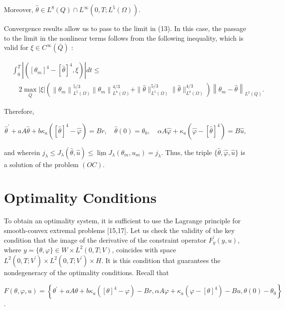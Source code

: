 \documentclass[10pt]{article}
\begin{document}
Moreover, $\widehat{\theta} \in L^{8}(Q) \cap L^{\infty}\left(0, T ; L^{5}(\Omega)\right)$.

Convergence results allow us to pass to the limit in (13). In this case, the passage to the limit in the nonlinear terms follows from the following inequality, which is valid for $\xi \in C^{\infty}(\bar{Q})$ :

$$
\begin{aligned}
& \int_{0}^{T}\left|\left(\left[\theta_{m}\right]^{4}-[\widehat{\theta}]^{4}, \xi\right)\right| d t \leq \\
& \quad 2 \max _{\bar{Q}}|\xi|\left(\left\|\theta_{m}\right\|_{L^{5}(\Omega)}^{5 / 3}\left\|\theta_{m}\right\|_{L^{8}(\Omega)}^{4 / 3}+\|\widehat{\theta}\|_{L^{5}(\Omega)}^{5 / 3}\|\widehat{\theta}\|_{L^{8}(\Omega)}^{4 / 3}\right)\left\|\theta_{m}-\widehat{\theta}\right\|_{L^{2}(Q)} .
\end{aligned}
$$

Therefore,

$$
\widehat{\theta}^{\prime}+a A \widehat{\theta}+b \kappa_{a}\left([\widehat{\theta}]^{4}-\widehat{\varphi}\right)=B r, \quad \widehat{\theta}(0)=\theta_{0}, \quad \alpha A \widehat{\varphi}+\kappa_{a}\left(\widehat{\varphi}-[\widehat{\theta}]^{4}\right)=B \widehat{u},
$$

and wherein $j_{\lambda} \leq J_{\lambda}(\widehat{\theta}, \widehat{u}) \leq \underline{\lim } J_{\lambda}\left(\theta_{m}, u_{m}\right)=j_{\lambda}$. Thus, the triple $\{\widehat{\theta}, \widehat{\varphi}, \widehat{u}\}$ is a solution of the problem $(O C)$.

\section{Optimality Conditions}
To obtain an optimality system, it is sufficient to use the Lagrange principle for smooth-convex extremal problems [15,17]. Let us check the validity of the key condition that the image of the derivative of the constraint operator $F_{y}^{\prime}(y, u)$, where $y=\{\theta, \varphi\} \in W \times L^{2}(0, T ; V)$, coincides with space $L^{2}\left(0, T ; V^{\prime}\right) \times L^{2}\left(0, T ; V^{\prime}\right) \times H$. It is this condition that guarantees the nondegeneracy of the optimality conditions. Recall that

$F(\theta, \varphi, u)=\left\{\theta^{\prime}+a A \theta+b \kappa_{a}\left([\theta]^{4}-\varphi\right)-B r, \alpha A \varphi+\kappa_{a}\left(\varphi-[\theta]^{4}\right)-B u, \theta(0)-\theta_{0}\right\}$.
\end{document}
